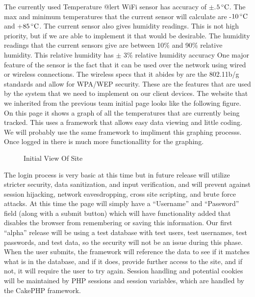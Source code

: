 \documentclass{report}
\begin{document}
\newline
\indent
	The currently used Temperature @lert WiFi sensor has accuracy of $\pm$.$5\,^{\circ}{\rm C}$. The max and minimum temperatures that the current sensor will calculate are -$10\,^{\circ}{\rm C}$ and +$85\,^{\circ}{\rm C}$. The current sensor also gives humidity readings. This is not high priority, but if we are able to implement it that would be desirable.
 The humidity readings that the current sensors give are between 10$\%$ and 90$\%$ relative humidity. 
This relative humidity has $\pm$ 3$\%$ relative humidity accuracy One major feature of the sensor is the fact that it can be used over the network using wired or wireless connections. 
The wireless specs that it abides by are the 802.11b/g standards and allow for WPA/WEP security. These are the features that are used by the system that we need to implement on our client devices.
	\newline
	\indent
The website that we inherited from the previous team initial page looks like the following figure. On this page it shows a graph of all the temperatures that are currently being tracked. This uses a framework that allows easy data viewing and little coding. We will probably use the same framework to impliment this graphing processs. Once logged in there is much more functionallity for the graphing. 
\begin{figure}[H]
\caption{Initial View Of Site}
\end{figure}
\newpage
The login process is very basic at this time but in future release will utilize stricter security, data sanitization, and input verification, and will prevent against session hijacking, network eavesdropping, cross site scripting, and brute force attacks.  At this time the page will simply have a “Username” and “Password” field (along with a submit button) which will have functionality added that disables the browser from remembering or saving this information.  Our first “alpha” release will be using a test database with test users, test usernames, test passwords, and test data, so the security will not be an issue during this phase. When the user submits, the framework will reference the data to see if it matches what is in the database, and if it does, provide further access to the site, and if not, it will require the user to try again.  Session handling and potential cookies will be maintained by PHP sessions and session variables, which are handled by the CakePHP framework. 	
\end{document}
